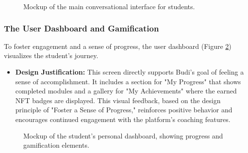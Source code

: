 \begin{figure}[h]
    \centering
    \caption{Mockup of the main conversational interface for students.}
    \label{fig:ui_chat}
\end{figure}

\subsubsection{The User Dashboard and Gamification}
To foster engagement and a sense of progress, the user dashboard (Figure \ref{fig:ui_user_dashboard}) visualizes the student's journey.
\begin{itemize}
    \item \textbf{Design Justification:} This screen directly supports Budi's goal of feeling a sense of accomplishment. It includes a section for "My Progress" that shows completed modules and a gallery for "My Achievements" where the earned NFT badges are displayed. This visual feedback, based on the design principle of "Foster a Sense of Progress," reinforces positive behavior and encourages continued engagement with the platform's coaching features.
\end{itemize}

\begin{figure}[h]
    \centering
    \caption{Mockup of the student's personal dashboard, showing progress and gamification elements.}
    \label{fig:ui_user_dashboard}
\end{figure}

